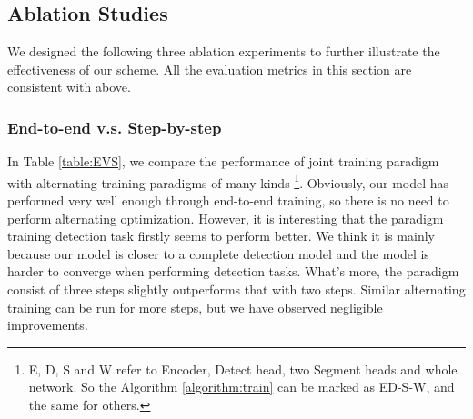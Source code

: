 \documentclass[10pt,twocolumn,letterpaper]{article}
\begin{document}
\begin{table}
\begin{center}
\end{center}
\caption{Lane Detection Results: comparing the proposed YOLOP with state-of-the-art lane detection methods.}
\label{table:ll_result}
\end{table}


\subsection{Ablation Studies}
We designed the following three ablation experiments to further illustrate the effectiveness of our scheme. All the evaluation metrics in this section are consistent with above.

\subsubsection{End-to-end v.s. Step-by-step}
In Table \ref{table:EVS}, we compare the performance of joint training paradigm with alternating training paradigms of many kinds \footnote{E, D, S and W refer to Encoder, Detect head, two Segment heads and whole network. So the Algorithm \ref{algorithm:train} can be marked as ED-S-W, and the same for others.}. Obviously, our model has performed very well enough through end-to-end training, so there is no need to perform alternating optimization. However, it is interesting that the paradigm training detection task firstly seems to perform better. We think it is mainly because our model is closer to a complete detection model and the model is harder to converge when performing detection tasks. What's more, the paradigm consist of three steps slightly outperforms that with two steps. Similar alternating training can be run for more steps, but we have observed negligible improvements.
\end{document}
